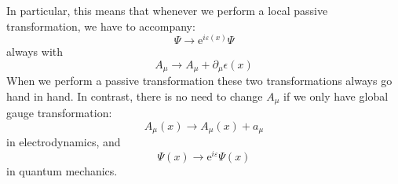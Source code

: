 In particular, this means that whenever we perform a local passive transformation, we have to accompany:
\begin{equation}
\Psi \rightarrow \mathrm{e}^{i \varepsilon(x)} \Psi
\end{equation}
always with
\begin{equation}
A_{\mu} \rightarrow A_{\mu}+\partial_{\mu} \epsilon(x)
\end{equation}
When we perform a passive transformation these two transformations always go hand in hand. In contrast, there is no need to change $A_{\mu}$ if we only have global gauge transformation:
$$
A_{\mu}(x) \rightarrow A_{\mu}(x)+a_{\mu}
$$
in electrodynamics, and
$$
\Psi(x) \rightarrow \mathrm{e}^{i \varepsilon} \Psi(x)
$$
in quantum mechanics.